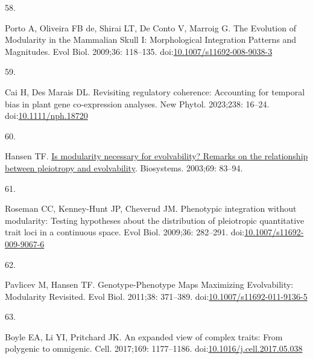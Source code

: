 \documentclass[
]{article}
\newlength{\cslhangindent}
\newlength{\csllabelwidth}
\newenvironment{CSLReferences}[2] %
 {\begin{list}{}{%
  \setlength{\itemindent}{0pt}
  \setlength{\leftmargin}{0pt}
  \setlength{\parsep}{0pt}
  \ifodd #1
   \setlength{\leftmargin}{\cslhangindent}
   \setlength{\itemindent}{-1\cslhangindent}
  \fi
  \setlength{\itemsep}{#2\baselineskip}}}
 {\end{list}}
\newcommand{\CSLLeftMargin}[1]{\parbox[t]{\csllabelwidth}{\strut#1\strut}}
\newcommand{\CSLRightInline}[1]{\parbox[t]{\linewidth - \csllabelwidth}{\strut#1\strut}}
\begin{document}
\begin{CSLReferences}{0}{1}
\CSLLeftMargin{58. }%
\CSLRightInline{Porto A, Oliveira FB de, Shirai LT, De Conto V, Marroig
G. {The Evolution of Modularity in the Mammalian Skull I: Morphological
Integration Patterns and Magnitudes}. Evol Biol. 2009;36: 118--135.
doi:\href{https://doi.org/10.1007/s11692-008-9038-3}{10.1007/s11692-008-9038-3}}

\CSLLeftMargin{59. }%
\CSLRightInline{Cai H, Des Marais DL. Revisiting regulatory coherence:
Accounting for temporal bias in plant gene co-expression analyses. New
Phytol. 2023;238: 16--24.
doi:\href{https://doi.org/10.1111/nph.18720}{10.1111/nph.18720}}

\CSLLeftMargin{60. }%
\CSLRightInline{Hansen TF.
\href{https://www.ncbi.nlm.nih.gov/pubmed/12689723}{Is modularity
necessary for evolvability? Remarks on the relationship between
pleiotropy and evolvability}. Biosystems. 2003;69: 83--94. }

\CSLLeftMargin{61. }%
\CSLRightInline{Roseman CC, Kenney-Hunt JP, Cheverud JM. Phenotypic
integration without modularity: Testing hypotheses about the
distribution of pleiotropic quantitative trait loci in a continuous
space. Evol Biol. 2009;36: 282--291.
doi:\href{https://doi.org/10.1007/s11692-009-9067-6}{10.1007/s11692-009-9067-6}}

\CSLLeftMargin{62. }%
\CSLRightInline{Pavlicev M, Hansen TF. {{Genotype-Phenotype} Maps
Maximizing Evolvability: Modularity Revisited}. Evol Biol. 2011;38:
371--389.
doi:\href{https://doi.org/10.1007/s11692-011-9136-5}{10.1007/s11692-011-9136-5}}

\CSLLeftMargin{63. }%
\CSLRightInline{Boyle EA, Li YI, Pritchard JK. An expanded view of
complex traits: From polygenic to omnigenic. Cell. 2017;169: 1177--1186.
doi:\href{https://doi.org/10.1016/j.cell.2017.05.038}{10.1016/j.cell.2017.05.038}}

\end{CSLReferences}
\end{document}

